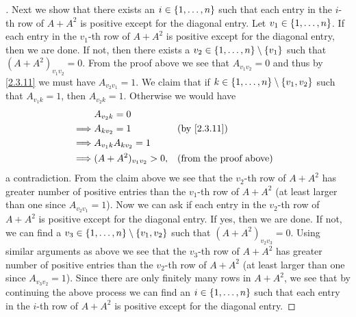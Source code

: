 \begin{proof}[]
	Next we show that there exists an \(i \in \left\lbrace1, \dots, n\right\rbrace\) such that each entry in the \(i\)-th row of \(A + A^2\) is positive except for the diagonal entry.
	Let \(v_1 \in \left\lbrace1, \dots, n\right\rbrace\).
	If each entry in the \(v_1\)-th row of \(A + A^2\) is positive except for the diagonal entry, then we are done.
	If not, then there exists a \(v_2 \in \left\lbrace1, \dots, n\right\rbrace \setminus \left\lbrace v_1\right\rbrace\) such that \((A + A^2)_{v_1 v_2} = 0\).
	From the proof above we see that \(A_{v_1 v_2} = 0\) and thus by \cref{2.3.11} we must have \(A_{v_2 v_1} = 1\).
	We claim that if \(k \in \left\lbrace1, \dots, n\right\rbrace \setminus \left\lbrace v_1, v_2\right\rbrace\) such that \(A_{v_1 k} = 1\), then \(A_{v_2 k} = 1\).
	Otherwise we would have
	\begin{align*}
		         & A_{v_2 k} = 0                                               \\
		\implies & A_{k v_2} = 1            &  & \by{2.3.11}                   \\
		\implies & A_{v_1 k} A_{k v_2} = 1                                     \\
		\implies & (A + A^2)_{v_1 v_2} > 0, &  & \text{(from the proof above)}
	\end{align*}
	a contradiction.
	From the claim above we see that the \(v_2\)-th row of \(A + A^2\) has greater number of positive entries than the \(v_1\)-th row of \(A + A^2\) (at least larger than one since \(A_{v_2 v_1} = 1\)).
	Now we can ask if each entry in the \(v_2\)-th row of \(A + A^2\) is positive except for the diagonal entry.
	If yes, then we are done.
	If not, we can find a \(v_3 \in \left\lbrace1, \dots, n\right\rbrace \setminus \left\lbrace v_1, v_2\right\rbrace\) such that \((A + A^2)_{v_2 v_3} = 0\).
	Using similar arguments as above we see that the \(v_3\)-th row of \(A + A^2\) has greater number of positive entries than the \(v_2\)-th row of \(A + A^2\) (at least larger than one since \(A_{v_3 v_2} = 1\)).
	Since there are only finitely many rows in \(A + A^2\), we see that by continuing the above process we can find an \(i \in \left\lbrace1, \dots, n\right\rbrace\) such that each entry in the \(i\)-th row of \(A + A^2\) is positive except for the diagonal entry.


\end{proof}
